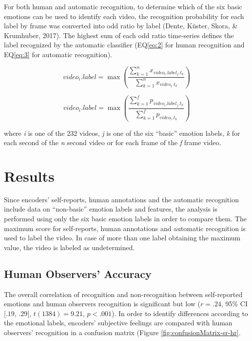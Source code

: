 \documentclass[man]{apa6}
\begin{document}
For both human and automatic recognition, to determine which of the six basic emotions can be used to identify each video, the recognition probability for each label by frame was converted into odd ratio by label (Dente, Küster, Skora, \& Krumhuber, 2017). The highest sum of each odd ratio time-series defines the label recognized by the automatic classifier (EQ\ref{eq:2} for human recognition and EQ\ref{eq:3} for automatic recognition).

\begin{equation}
\label{eq:2}
video_{i}.label = \max\left(\frac{\sum_{k=1}^{n}x_{video_{i}.label_{j}.t_{k}}}{\sum_{k=1}^{n}x_{video_{i}.t_{k}}}\right)
\end{equation}

\begin{equation}
\label{eq:3}
video_{i}.label = \max\left(\frac{\sum_{k=1}^{f}p_{video_{i}.label_{j}.t_{k}}}{\sum_{k=1}^{f}p_{video_{i}.t_{k}}}\right)
\end{equation}

where \emph{i} is one of the 232 videos, \emph{j} is one of the six \enquote{basic} emotion labels, \emph{k} for each second of the \emph{n} second video or for each frame of the \emph{f} frame video.

\hypertarget{results}{%
\section{Results}\label{results}}

Since encoders' self-reports, human annotations and the automatic recognition include data on \enquote{non-basic} emotion labels and features, the analysis is performed using only the six basic emotion labels in order to compare them. The maximum score for self-reports, human annotations and automatic recognition is used to label the video. In case of more than one label obtaining the maximum value, the video is labeled as undetermined.

\hypertarget{human-observers-accuracy}{%
\subsection{Human Observers' Accuracy}\label{human-observers-accuracy}}

The overall correlation of recognition and non-recognition between self-reported emotions and human observers recognition is significant but low (\(r = .24\), 95\% CI \([.19\), \(.29]\), \(t(1384) = 9.21\), \(p < .001\)). In order to identify differences according to the emotional labels, encoders' subjective feelings are compared with human observers' recognition in a confusion matrix (Figure \ref{fig:confusionMatrix-sr-hr}.
\end{document}
